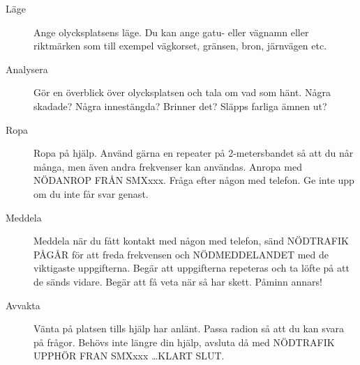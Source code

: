 \begin{description}
\item[Läge] Ange olycksplatsens läge. Du kan ange gatu- eller vägnamn eller riktmärken som
  till exempel vägkorset, gränsen, bron, järnvägen etc.
\item[Analysera] Gör en överblick över olycksplatsen och tala om vad som hänt.
  Några skadade? Några innestängda? Brinner det? Släpps farliga ämnen ut?
\item[Ropa] Ropa på hjälp. Använd gärna en repeater på 2-metersbandet så att du når många,
  men även andra frekvenser kan användas. Anropa med NÖDANROP FRÅN SMXxxx.
  Fråga efter någon med telefon. Ge inte upp om du inte får svar genast.
\item[Meddela] Meddela när du fått kontakt med någon med telefon, sänd NÖDTRAFIK PÅGÅR
  för att freda frekvensen och NÖDMEDDELANDET med de viktigaste uppgifterna.
  Begär att uppgifterna repeteras och ta löfte på att de sänds vidare.
  Begär att få veta när så har skett. Påminn annars!
\item[Avvakta] Vänta på platsen tills hjälp har anlänt.
  Passa radion så att du kan svara på frågor. Behövs inte längre din hjälp, avsluta då med
  NÖDTRAFIK UPPHÖR FRAN SMXxxx \dots KLART SLUT.
\end{description}
